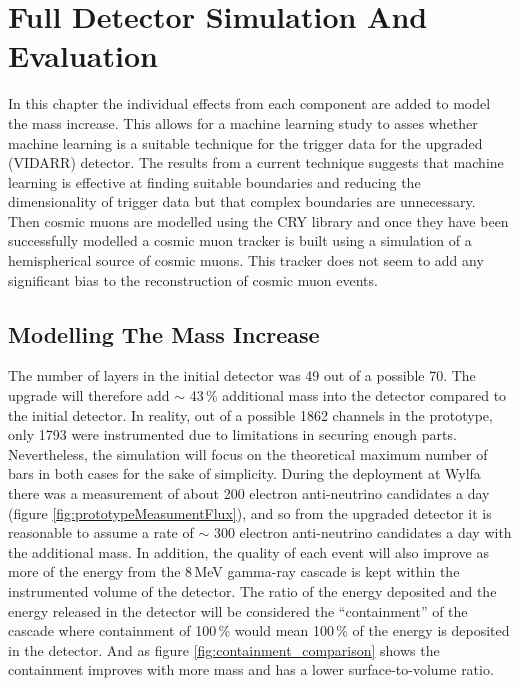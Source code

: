 
\chapter{Full Detector Simulation And Evaluation}\label{chp:DataAnalysisTechniques}

In this chapter the individual effects from each component are added to model the mass increase. This allows for a machine learning study to asses whether machine learning is a suitable technique for the trigger data for the upgraded (VIDARR) detector. The results from a current technique suggests that machine learning is effective at finding suitable boundaries and reducing the dimensionality of trigger data but that complex boundaries are unnecessary. Then cosmic muons are modelled using the CRY library \cite{ieee_cry_2007} and once they have been successfully modelled a cosmic muon tracker is built using a simulation of a hemispherical source of cosmic muons. This tracker does not seem to add any significant bias to the reconstruction of cosmic muon events.

\section{Modelling The Mass Increase}
The number of layers in the initial detector was 49 out of a possible 70. The upgrade will therefore add $\sim$ 43\,\% additional mass into the detector compared to the initial detector. In reality, out of a possible 1862 channels in the prototype, only 1793 were instrumented due to limitations in securing enough parts. Nevertheless, the simulation will focus on the theoretical maximum number of bars in both cases for the sake of simplicity. During the deployment at Wylfa there was a measurement of about 200 electron anti-neutrino candidates a day \cite{Carroll_2018} (figure \ref{fig:prototypeMeasumentFlux}), and so from the upgraded detector it is reasonable to assume a rate of $\sim$ 300 electron anti-neutrino candidates a day with the additional mass. In addition, the quality of each event will also improve as more of the energy from the 8\,MeV gamma-ray cascade is kept within the instrumented volume of the detector. The ratio of the energy deposited and the energy released in the detector will be considered the ``containment'' of the cascade where containment of 100\,\% would mean 100\,\% of the energy is deposited in the detector. And as figure \ref{fig:containment_comparison} shows the containment improves with more mass and has a lower surface-to-volume ratio. %

